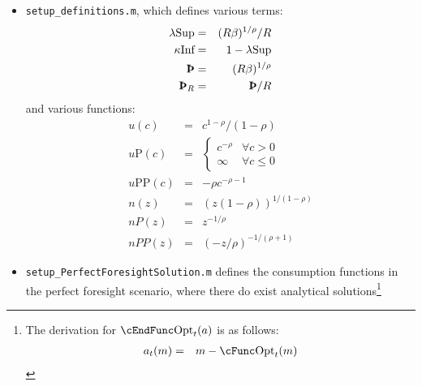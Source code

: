 \documentclass[titlepage,abstract]{\econtex}
\providecommand{\lambdaSup}{\lambda\text{Sup}}
\providecommand{\kappaInf}{\kappa\text{Inf}}
\providecommand{\cFuncOpt}{\cFunc\text{Opt}}
\providecommand{\cEndFuncOpt}{\cEndFunc\text{Opt}}
\providecommand{\hMinLife}{\mathrm{h}\text{MinLife}}
\providecommand{\hBorrowableLife}{\mathrm{h}\text{BorrowableLife}}
\providecommand{\hAccessibleLife}{\mathrm{h}\text{AccessibleLife}}
\providecommand{\hEndBorrowableLife}{\mathfrak{h}\text{BorrowableLife}}
\providecommand{\hEndAccessibleLife}{\mathfrak{h}\text{AccessibleLife}}
\providecommand{\uP}{u\text{P}}
\providecommand{\uPP}{u\text{PP}}
\begin{document}
\begin{itemize}
\begin{itemize}
          \item $\hMinLife_{t}$ is the human wealth at the beginning of time $t$, assuming every period onwards including time $t$, the labor income shock will be at its lowest possible level, i.e. the unemployment benefit.
          \item $\hBorrowableLife_{t}$ is the human wealth that can be borrowed against\footnote{One might wonder if one should also define $\hAccessibleLife_{t}$, and the answer is no. Basically we define the beginning of period human wealth, as an aid to derive the end of period human wealth one period before. However $\hEndAccessibleLife_{t}$ is derived from $\hEndBorrowableLife_{t+1}$ and so there is no need to do so. Even if we define it, it is not clear what it means.} at the beginning of time $t$.
          \end{itemize}
      \item \texttt{setup\_definitions.m}, which defines various terms:
      \begin{eqnarray}
      \lambdaSup &=& (R \beta)^{1/\rho}/R \\
      \kappaInf  &=& 1-\lambdaSup \\
      \textbf{\TH} &=& (R \beta)^{1/\rho} \\
      \textbf{\TH}_{R} &=& \textbf{\TH}/R
      \end{eqnarray}
      and various functions:
      \begin{eqnarray}
      u(c) &=& c^{1-\rho}/(1-\rho) \\
      \uP(c) &=&
      \begin{cases}
      c^{-\rho} & \forall c>0 \\
      \infty & \forall c \leq 0
      \end{cases} \\
      \uPP(c) &=& -\rho c^{-\rho-1} \\
      n(z) &=& (z(1-\rho))^{1/(1-\rho)} \\
      nP(z) &=& z^{-1/\rho} \\
      nPP(z) &=& (-z/\rho)^{-1/(\rho+1)}
      \end{eqnarray}
      \item \texttt{setup\_PerfectForesightSolution.m} defines the consumption functions in the perfect foresight scenario, where there do exist analytical solutions\footnote{
          The derivation for $\cEndFuncOpt_{t}(a)$ is as follows:
          \begin{eqnarray}
          a_{t}(m) &=& m-\cFuncOpt_{t}(m) \\

\end{eqnarray}}
\end{itemize}
\end{document}
